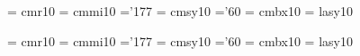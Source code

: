  \font\frtnrm  = cmr10     %
 \font\frtnmi  = cmmi10    %
    \skewchar\frtnmi ='177          %
 \font\frtnsy  = cmsy10    %
    \skewchar\frtnsy ='60           %
 \font\frtnbf  = cmbx10    %
 \font\frtnly  = lasy10   %

 \font\svtnrm  = cmr10     %
 \font\svtnmi  = cmmi10    %
    \skewchar\svtnmi ='177          %
 \font\svtnsy  = cmsy10    %
    \skewchar\svtnsy ='60           %
 \font\svtnbf  = cmbx10    %
 \font\svtnly  = lasy10   %

